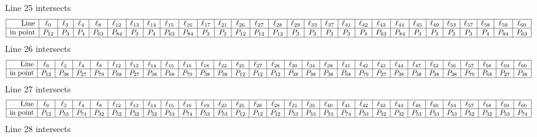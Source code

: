 \documentclass{article}
\begin{document}
{$$$$
Line 25 intersects 
$$
\begin{array}{|r*{28}{|c}|}
\hline
\mbox{Line}  & \ell_{0} & \ell_{3} & \ell_{4} & \ell_{8} & \ell_{12} & \ell_{13} & \ell_{14} & \ell_{15} & \ell_{16} & \ell_{17} & \ell_{21} & \ell_{26} & \ell_{27} & \ell_{28} & \ell_{29} & \ell_{33} & \ell_{37} & \ell_{41} & \ell_{42} & \ell_{43} & \ell_{44} & \ell_{45} & \ell_{49} & \ell_{53} & \ell_{57} & \ell_{58} & \ell_{59} & \ell_{60}\\
\hline
\mbox{in point}  & P_{12} & P_{3} & P_{4} & P_{63} & P_{84} & P_{3} & P_{4} & P_{63} & P_{84} & P_{3} & P_{3} & P_{12} & P_{12} & P_{12} & P_{3} & P_{3} & P_{3} & P_{3} & P_{4} & P_{63} & P_{84} & P_{3} & P_{3} & P_{3} & P_{3} & P_{4} & P_{84} & P_{63}\\
\hline
\end{array}
$$
Line 26 intersects 
$$
\begin{array}{|r*{28}{|c}|}
\hline
\mbox{Line}  & \ell_{0} & \ell_{3} & \ell_{4} & \ell_{8} & \ell_{12} & \ell_{13} & \ell_{14} & \ell_{15} & \ell_{16} & \ell_{18} & \ell_{22} & \ell_{25} & \ell_{27} & \ell_{28} & \ell_{30} & \ell_{34} & \ell_{39} & \ell_{41} & \ell_{42} & \ell_{43} & \ell_{44} & \ell_{47} & \ell_{52} & \ell_{56} & \ell_{57} & \ell_{58} & \ell_{59} & \ell_{60}\\
\hline
\mbox{in point}  & P_{12} & P_{38} & P_{27} & P_{79} & P_{68} & P_{27} & P_{38} & P_{68} & P_{79} & P_{38} & P_{38} & P_{12} & P_{12} & P_{12} & P_{38} & P_{38} & P_{38} & P_{68} & P_{79} & P_{27} & P_{38} & P_{38} & P_{38} & P_{38} & P_{79} & P_{68} & P_{27} & P_{38}\\
\hline
\end{array}
$$
Line 27 intersects 
$$
\begin{array}{|r*{28}{|c}|}
\hline
\mbox{Line}  & \ell_{0} & \ell_{3} & \ell_{4} & \ell_{8} & \ell_{12} & \ell_{13} & \ell_{14} & \ell_{15} & \ell_{16} & \ell_{19} & \ell_{23} & \ell_{25} & \ell_{26} & \ell_{28} & \ell_{31} & \ell_{35} & \ell_{40} & \ell_{41} & \ell_{42} & \ell_{43} & \ell_{44} & \ell_{48} & \ell_{50} & \ell_{54} & \ell_{57} & \ell_{58} & \ell_{59} & \ell_{60}\\
\hline
\mbox{in point}  & P_{12} & P_{53} & P_{74} & P_{32} & P_{52} & P_{32} & P_{52} & P_{53} & P_{74} & P_{53} & P_{53} & P_{12} & P_{12} & P_{12} & P_{53} & P_{53} & P_{53} & P_{74} & P_{53} & P_{52} & P_{32} & P_{53} & P_{53} & P_{53} & P_{52} & P_{32} & P_{53} & P_{74}\\
\hline
\end{array}
$$
Line 28 intersects 
}
\end{document}
